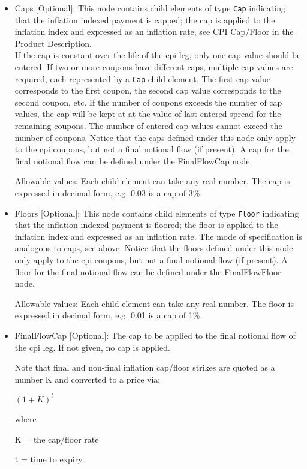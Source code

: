 \begin{itemize}
\item Caps [Optional]: This node contains child elements of type
  \lstinline!Cap! indicating that the inflation indexed payment is
  capped; the cap is applied to the inflation index and expressed as
  an inflation rate, see CPI Cap/Floor in the Product Description. \\
  If the cap is constant over the life of the 
cpi leg, only one cap value should
be entered. If two or more coupons have different caps, multiple cap values
are required, each represented by a \lstinline!Cap! child element. The first cap value
corresponds to the first coupon, the second cap value corresponds to the
second coupon, etc. If the number of coupons exceeds the number of cap
values, the cap will be kept at at the value of last entered spread for the
remaining coupons. The number of entered cap values cannot exceed the
number of coupons. Notice that the caps defined under this node only apply to the cpi coupons,
but not a final notional flow (if present). A cap for the final notional flow can be defined
under the FinalFlowCap node.

Allowable values: Each child element can take any real number. The cap is
expressed in decimal form, e.g. 0.03 is a cap of 3\%.

\item Floors [Optional]: This node contains child elements of type
  \lstinline!Floor! indicating that the inflation indexed payment is
  floored; the floor is applied to the inflation index and expressed as
  an inflation rate. The mode of specification is analogous to caps, see
  above. Notice that the floors defined under this node only apply to the cpi coupons,
  but not a final notional flow (if present). A floor for the final notional flow can be defined
  under the FinalFlowFloor node.

Allowable values: Each child element can take any real number. The floor is
expressed in decimal form, e.g. 0.01 is a cap of 1\%.

\item FinalFlowCap [Optional]: The cap to be applied to the final notional flow of the cpi leg. If not given, no cap
  is applied.

Note that final and non-final inflation cap/floor strikes are quoted as a number K and converted to a price via:

$
(1+K)^t
$

 where

K = the cap/floor rate

t = time to expiry.


\end{itemize}
